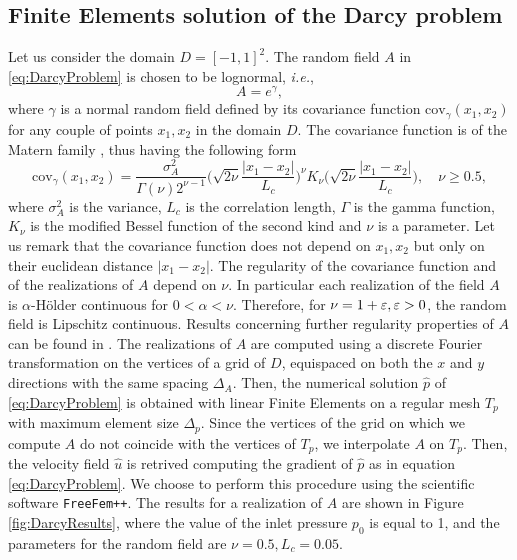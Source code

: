 

\subsection{Finite Elements solution of the Darcy problem}

Let us consider the domain $D = [-1,1]^2$. The random field $A$ in \eqref{eq:DarcyProblem} is chosen to be lognormal, \textit{i.e.}, 
\begin{equation}\label{eq:RandomField}
	A = e^\gamma,
\end{equation}
where $\gamma$ is a normal random field defined by its covariance function $\mathrm{cov}_\gamma(x_1,x_2)$ for any couple of points $x_1,x_2$ in the domain $D$. The covariance function is of the Matern family \cite{Nobile2015}, thus having the following form
\begin{equation}\label{eq:CovFunction}
	\mathrm{cov}_\gamma(x_1,x_2) = \frac{\sigma_A^2}{\Gamma(\nu)2^{\nu-1}}\Big(\sqrt{2\nu}\frac{|x_1-x_2|}{L_c}\Big)^\nu K_{\nu}\Big(\sqrt{2\nu}\frac{|x_1-x_2|}{L_c}\Big), \quad \nu \geq 0.5,
\end{equation}
where $\sigma_A^2$ is the variance, $L_c$ is the correlation length, $\Gamma$ is the gamma function, $K_\nu$ is the modified Bessel function of the second kind and $\nu$ is a parameter. Let us remark that the covariance function does not depend on $x_1, x_2$ but only on their euclidean distance $|x_1 - x_2|$. The regularity of the covariance function and of the realizations of $A$ depend on $\nu$. In particular each realization of the field $A$ is $\alpha$-Hölder continuous for $0 < \alpha < \nu$. Therefore, for $\nu = 1 + \varepsilon, \varepsilon > 0$, the random field is Lipschitz continuous. Results concerning further regularity properties of $A$ can be found in \cite{Nobile2015}. The realizations of $A$ are computed using a discrete Fourier transformation on the vertices of a grid of $D$, equispaced on both the $x$ and $y$ directions with the same spacing $\Delta_A$. Then, the numerical solution $\hat{p}$ of \eqref{eq:DarcyProblem} is obtained with linear Finite Elements on a regular mesh $T_p$ with maximum element size $\Delta_p$. Since the vertices of the grid on which we compute $A$ do not coincide with the vertices of $T_p$, we interpolate $A$ on $T_p$. Then, the velocity field $\hat{u}$ is retrived computing the gradient of $\hat{p}$ as in equation \eqref{eq:DarcyProblem}. We choose to perform this procedure using the scientific software \texttt{FreeFem++}. The results for a realization of $A$ are shown in Figure \ref{fig:DarcyResults}, where the value of the inlet pressure $p_0$ is equal to 1, and the parameters for the random field are $\nu = 0.5, L_c = 0.05$. 

